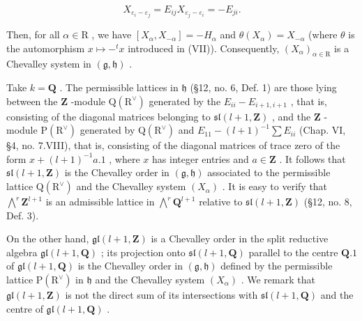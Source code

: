 \[
X _ {\varepsilon_ {i} - \varepsilon_ {j}} = E _ {i j} X _ {\varepsilon_ {j} - \varepsilon_ {i}} = - E _ {j i}.
\]

Then, for all \(\alpha \in \mathrm{R}\) , we have \([X_{\alpha}, X_{-\alpha}] = -H_{\alpha}\) and \(\theta(X_{\alpha}) = X_{-\alpha}\) (where \(\theta\) is the automorphism \(x \mapsto -^{t} x\) introduced in (VII)). Consequently, \((X_{\alpha})_{\alpha \in \mathrm{R}}\) is a Chevalley system in \((\mathfrak{g}, \mathfrak{h})\) .

Take \(k = \mathbf{Q}\) . The permissible lattices in \(\mathfrak{h}\) (§12, no. 6, Def. 1) are those lying between the \(\mathbf{Z}\) -module \(\mathrm{Q}(\mathrm{R}^{\vee})\) generated by the \(E_{ii} - E_{i+1,i+1}\) , that is, consisting of the diagonal matrices belonging to \(\mathfrak{sl}(l+1,\mathbf{Z})\) , and the \(\mathbf{Z}\) -module \(\mathrm{P}(\mathrm{R}^{\vee})\) generated by \(\mathrm{Q}(\mathrm{R}^{\vee})\) and \(E_{11} - (l+1)^{-1}\sum E_{ii}\) (Chap. VI, §4, no. 7.VIII), that is, consisting of the diagonal matrices of trace zero of the form \(x + (l+1)^{-1}a.1\) , where \(x\) has integer entries and \(a\in\mathbf{Z}\) . It follows that \(\mathfrak{sl}(l+1,\mathbf{Z})\) is the Chevalley order in \((\mathfrak{g},\mathfrak{h})\) associated to the permissible lattice \(\mathrm{Q}(\mathrm{R}^{\vee})\) and the Chevalley system \((X_{\alpha})\) . It is easy to verify that \(\bigwedge^{r}\mathbf{Z}^{l+1}\) is an admissible lattice in \(\bigwedge^{r}\mathbf{Q}^{l+1}\) relative to \(\mathfrak{sl}(l+1,\mathbf{Z})\) (§12, no. 8, Def. 3).

On the other hand, \(\mathfrak{gl}(l+1,\mathbf{Z})\) is a Chevalley order in the split reductive algebra \(\mathfrak{gl}(l+1,\mathbf{Q})\) ; its projection onto \(\mathfrak{sl}(l+1,\mathbf{Q})\) parallel to the centre \(\mathbf{Q}.1\) of \(\mathfrak{gl}(l+1,\mathbf{Q})\) is the Chevalley order in \((\mathfrak{g},\mathfrak{h})\) defined by the permissible lattice \(\mathrm{P}(\mathrm{R}^{\vee})\) in \(\mathfrak{h}\) and the Chevalley system \((X_{\alpha})\) . We remark that \(\mathfrak{gl}(l+1,\mathbf{Z})\) is not the direct sum of its intersections with \(\mathfrak{sl}(l+1,\mathbf{Q})\) and the centre of \(\mathfrak{gl}(l+1,\mathbf{Q})\) .
\relax{}
